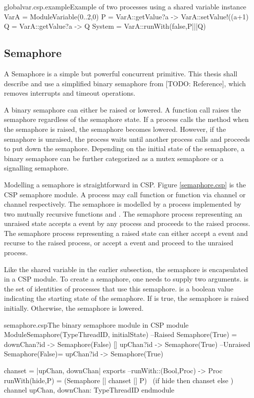 \documentclass[a4paper, 12pt]{article}
\begin{document}
\begin{cspinline}{globalvar.csp.example}{Example of two processes using a shared variable}
instance VarA = ModuleVariable({0..2},0)
P = VarA::getValue?a -> VarA::setValue!((a+1)%
Q = VarA::getValue?a -> Q
System = VarA::runWith(false,P|||Q)
\end{cspinline}


\subsection{Semaphore}
A Semaphore is a simple but powerful concurrent primitive. This thesis shall describe and use a simplified binary semaphore from [TODO: Reference], which removes interrupts and timeout operations. 

A binary semaphore can either be raised or lowered. A  function call raises the semaphore regardless of the semaphore state. If a process calls the  method when the semaphore is raised, the semaphore becomes lowered. However, if the semaphore is unraised, the process waits until another process calls  and proceeds to put down the semaphore. Depending on the initial state of the semaphore, a binary semaphore can be further categorized as a mutex semaphore or a signalling semaphore.

Modelling a semaphore is straightforward in CSP. Figure \ref{semaphore.csp} is the CSP semaphore module. A process may call  function or  function via channel  or channel  respectively. The semaphore is modelled by a process implemented by two mutually recursive functions  and . The semaphore process representing an unraised state accepts a  event by any process and proceeds to the raised process. The semaphore process representing a raised state can either accept a  event and recurse to the raised process, or accept a  event and proceed to the unraised process.

Like the shared variable in the earlier subsection, the semaphore is encapsulated in a CSP module. To create a semaphore, one needs to supply two arguments.  is the set of identities of processes that use this semaphore.  is a boolean value indicating the starting state of the semaphore. If  is true, the semaphore is raised initially. Otherwise, the semaphore is lowered. 
\begin{cspfloat}{semaphore.csp}{The binary semaphore module in CSP}
module ModuleSemaphore(TypeThreadID, initialState)
  --Raised
  Semaphore(True) = downChan?id -> Semaphore(False)
                   [] upChan?id -> Semaphore(True)
  --Unraised
  Semaphore(False)= upChan?id   -> Semaphore(True)
  
  chanset = {|upChan, downChan|}
exports
  --runWith::(Bool,Proc) -> Proc
  runWith(hide,P) = (Semaphore [| chanset |] P) \ 
                     (if hide then chanset else {})
  channel upChan, downChan: TypeThreadID
endmodule
\end{cspfloat}
\end{document}
